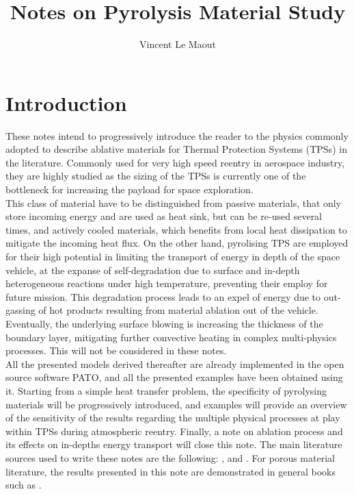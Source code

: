 \documentclass[english,10pt,a4paper,oneside,twocolumn,titlepage]{report}
\title{Notes on Pyrolysis Material Study}
\author{Vincent Le Maout}
\begin{document}
	\maketitle
	
	\section{Introduction}
	\label{section0}
	These notes intend to progressively introduce the
	reader to the physics commonly adopted to describe 
	ablative materials for Thermal Protection Systems 
	(TPSs) in the literature. Commonly used for 
	very high speed reentry in aerospace industry, they
	are highly studied as the sizing of the TPSs is 
	currently one of the bottleneck for increasing the 
	payload for space exploration. \\ 
	This class of material have to be distinguished from 
	passive materials, that only store incoming energy and
	are used as heat sink, but can be re-used several times,
	 and actively cooled materials, which benefits from local
	 heat dissipation to mitigate the incoming heat flux. On 
	 the other hand, pyrolising TPS are employed for their
	 high potential in limiting the transport of energy in depth
	 of the space vehicle, at the expanse of self-degradation 
	 due to surface and in-depth heterogeneous reactions
	  under high temperature, preventing their 
	  employ for future mission.
	 This degradation process leads to an expel of energy 
	 due to out-gassing of hot products resulting from
	  material	 ablation out of the vehicle. Eventually, the 
	 underlying surface blowing is increasing the 
	 thickness of the boundary layer, mitigating further
	 convective heating in complex multi-physics processes.
	 This will not be considered in these notes.	 \\
	 All the presented models derived thereafter
	 are already implemented in the open source 
	software PATO, and all the presented examples 
	have been obtained using it. 
	Starting from a simple heat transfer problem, the 
	specificity of pyrolysing materials will be progressively 
	introduced, and examples will provide an overview 
	of the sensitivity of the results regarding the 
	multiple physical processes at play within TPSs during
	atmospheric reentry. Finally, a note on ablation process
	and its effects on in-depths energy transport will close 
	this note. The main literature sources used to write these
	notes are the following: \cite{Lachaud2017}, 
	\cite{Marschall2015} and \cite{Johnston2014}. For 
	porous material literature, the results presented in this 
	note are demonstrated in general books such as 
	\cite{Whitaker1999}.
\end{document}
